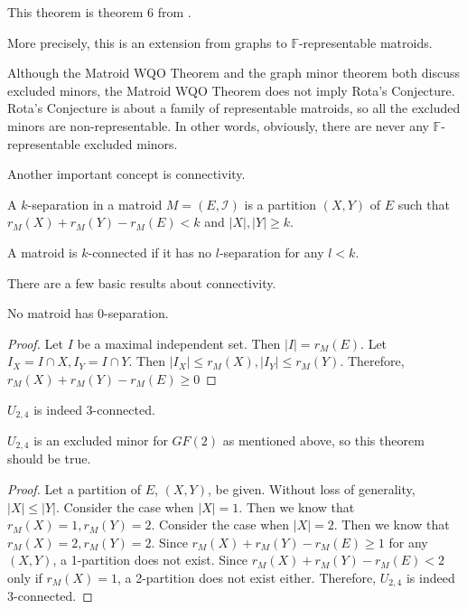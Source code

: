 This theorem is theorem 6 from \cite{solving}.

More precisely, this is an extension from graphs to $\mathbb{F}$-representable matroids.

Although the Matroid WQO Theorem and the graph minor theorem both discuss excluded minors, the Matroid WQO Theorem does not imply Rota's Conjecture.
Rota's Conjecture is about a family of representable matroids, so all the excluded minors are non-representable.
In other words, obviously, there are never any $\mathbb{F}$-representable excluded minors.

%

Another important concept is connectivity.
\begin{defn}
A $k$-separation in a matroid $M = (E, \mathcal{I})$ is a partition $(X, Y)$ of $E$ such that $r_M(X) + r_M(Y) - r_M(E) < k$ and $\lvert X \rvert, \lvert Y \rvert \geq k$.
\end{defn}
\begin{defn}
A matroid is $k$-connected if it has no $l$-separation for any $l < k$.
\end{defn}
% 
% 
% 

There are a few basic results about connectivity.

\begin{thm}
No matroid has 0-separation.
\end{thm}
\begin{proof}
Let $I$ be a maximal independent set.
Then $\lvert I \rvert = r_M(E)$.
Let $I_X = I \cap X, I_Y = I \cap Y$.
Then $\lvert I_X \rvert \leq r_M(X), \lvert I_Y \rvert \leq r_M(Y)$.
Therefore, $r_M(X) + r_M(Y) - r_M(E) \geq 0$
\end{proof}


\begin{thm}
$U_{2, 4}$ is indeed 3-connected.
\end{thm}
$U_{2, 4}$ is an excluded minor for $GF(2)$ as mentioned above, so this theorem should be true.
\begin{proof}
Let a partition of $E$, $(X, Y)$, be given.
Without loss of generality, $\lvert X \rvert \leq \lvert Y \rvert$.
Consider the case when $\lvert X \rvert = 1$.
Then we know that $r_M(X) = 1, r_M(Y) = 2$.
Consider the case when $\lvert X \rvert = 2$.
Then we know that $r_M(X) = 2, r_M(Y) = 2$.
Since $r_M(X) + r_M(Y) - r_M(E) \geq 1$ for any $(X, Y)$, a 1-partition does not exist.
Since $r_M(X) + r_M(Y) - r_M(E) < 2$ only if $r_M(X) = 1$, a 2-partition does not exist either.
Therefore, $U_{2, 4}$ is indeed 3-connected.
\end{proof}


